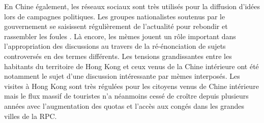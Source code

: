 \begin{description}
En Chine \'egalement, les r\'eseaux sociaux sont tr\`es utilis\'es pour la diffusion d{\textquoteright}id\'ees lors de campagnes politiques. Les groupes nationalistes soutenus par le gouvernement se saisissent r\'eguli\`erement de l{\textquoteright}actualit\'e pour rebondir et rassembler les foules \citep{Wu2007}. L\`a encore, les m\`emes jouent un r\^ole important dans l{\textquoteright}appropriation des discussions au travers de la r\'e-\'enonciation de sujets controvers\'es en des termes diff\'erents. Les tensions grandissantes entre les habitants du territoire de Hong Kong et ceux venus de la Chine int\'erieure ont \'et\'e notamment le sujet d{\textquoteright}une discussion int\'eressante par m\`emes interpos\'es. Les visites \`a Hong Kong sont tr\`es r\'egul\'ees pour les citoyens venus de Chine int\'erieure mais le flux massif de touristes n{\textquoteright}a n\'eanmoins cess\'e de cro\^itre depuis plusieurs ann\'ees avec l{\textquoteright}augmentation des quotas et l{\textquoteright}acc\`es aux cong\'es dans les grandes villes de la RPC. 


\end{description}
